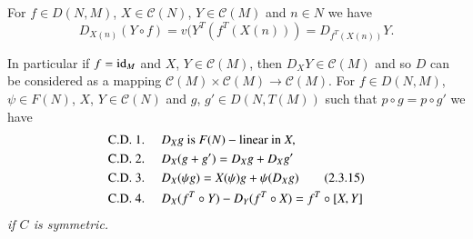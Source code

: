 \setcounter{subsection}{13}
\subsection{}\label{chap2:2.3.14}
For $f\in D(N,M)$, $X\in \mathscr{C}(N)$, $Y\in \mathscr{C}(M)$ and
$n\in N$ we have 
$$
D_{X(n)}(Y\circ f)=v(Y^{T}(f^{T}(X(n)))=D_{f^{T}(X(n))}Y.
$$

In particular if $f=\operatorname{id}_{M}$ and $X$, $Y\in\mathscr{C}(M)$, then
$D_{X}Y\in \mathscr{C}(M)$ and so $D$ can be considered as a mapping
$\mathscr{C}(M)\times\mathscr{C}(M)\to \mathscr{C}(M)$. For $f\in
D(N,M)$, $\psi\in F(N)$, $X$, $Y\in \mathscr{C}(N)$ and $g$, $g'\in
D(N,T(M))$ such that $p\circ g=p\circ g'$ we have
\begin{align*}
\text{C.D. 1. \quad} & D_{X}g\text{ is } F(N)-\text{linear in } X,\\
\text{C.D. 2. \quad} & D_{X}(g+g')=D_{X}g+D_{X}g'\\
\text{C.D. 3. \quad} & D_{X}(\psi
g)=X(\psi)g+\psi(D_{X}g)\tag{2.3.15}\label{chap2:2.3.15}\\
\text{C.D. 4. \quad} & D_{X}(f^{T}\circ Y)-D_{Y}(f^{T}\circ
X)=f^{T}\circ [X,Y] 
\end{align*}
{\em if $C$ is symmetric.}

